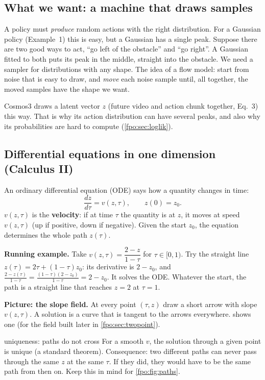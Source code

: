 \subsection{What we want: a machine that draws samples}
A policy must \emph{produce} random actions with the right distribution. For a Gaussian policy (Example~1) this is easy, but a Gaussian has a single peak. Suppose there are two good ways to act, ``go left of the obstacle'' and ``go right''. A Gaussian fitted to both puts its peak in the middle, straight into the obstacle. We need a sampler for distributions with any shape. The idea of a flow model: start from noise that is easy to draw, and \emph{move} each noise sample until, all together, the moved samples have the shape we want.

\begin{paperlink}
Cosmos3 draws a latent vector $z$ (future video and action chunk together, Eq.~3) this way. That is why its action distribution can have several peaks, and also why its probabilities are hard to compute (\cref{fpo:sec:loglik}).
\end{paperlink}

\subsection{Differential equations in one dimension (Calculus II)}
An ordinary differential equation (ODE) says how a quantity changes in time:
\begin{equation}
\frac{dz}{d\tau}=v(z,\tau),\qquad z(0)=z_0 .
\label{fpo:eq:ode1}
\end{equation}
$v(z,\tau)$ is the \textbf{velocity}: if at time $\tau$ the quantity is at $z$, it moves at speed $v(z,\tau)$ (up if positive, down if negative). Given the start $z_0$, the equation determines the whole path $z(\tau)$.

\textbf{Running example.} Take $v(z,\tau)=\dfrac{2-z}{1-\tau}$ for $\tau\in[0,1)$. Try the straight line $z(\tau)=2\tau+(1-\tau)z_0$: its derivative is $2-z_0$, and $\frac{2-z(\tau)}{1-\tau}=\frac{(1-\tau)(2-z_0)}{1-\tau}=2-z_0$. It solves the ODE. Whatever the start, the path is a straight line that reaches $z=2$ at $\tau=1$.

\textbf{Picture: the slope field.} At every point $(\tau,z)$ draw a short arrow with slope $v(z,\tau)$. A solution is a curve that is tangent to the arrows everywhere.  shows one (for the field built later in \cref{fpo:sec:twopoint}).

\begin{newc}{uniqueness: paths do not cross}
For a smooth $v$, the solution through a given point is unique (a standard theorem). Consequence: two different paths can never pass through the same $z$ at the same $\tau$. If they did, they would have to be the same path from then on. Keep this in mind for \cref{fpo:fig:paths}.
\end{newc}

